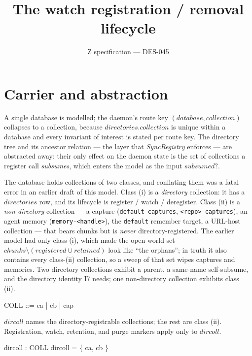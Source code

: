 \documentclass[a4paper]{article}
\begin{document}
\title{The watch registration / removal lifecycle}
\author{Z specification --- DES-045}
\date{}
\maketitle

\section{Carrier and abstraction}

A single database is modelled; the daemon's route key $(database, collection)$
collapses to a collection, because $directories.collection$ is unique within a
database and every invariant of interest is stated per route key.  The
directory tree and its ancestor relation --- the layer that
\textit{SyncRegistry} enforces --- are abstracted away: their only effect on the
daemon state is the set of collections a register call \textit{subsumes}, which
enters the model as the input $subsumed?$.

The database holds collections of two classes, and conflating them was a fatal
error in an earlier draft of this model.  Class (i) is a \textit{directory}
collection: it has a $directories$ row, and its lifecycle is register / watch /
deregister.  Class (ii) is a \textit{non-directory} collection --- a capture
(\texttt{default-captures}, \texttt{<repo>-captures}), an agent memory
(\texttt{memory-<handle>}), the \texttt{default} remember target, a URL-host
collection --- that bears chunks but is \textit{never} directory-registered.  The
earlier model had only class (i), which made the open-world set $chunks \setminus
(registered \cup retained)$ look like ``the orphans''; in truth it also contains
every class-(ii) collection, so a sweep of that set wipes captures and memories.
Two directory collections exhibit a parent, a same-name self-subsume, and the
directory identity I7 needs; one non-directory collection exhibits class (ii).

\begin{zed}
  COLL ::= ca | cb | cap
\end{zed}

$dircoll$ names the directory-registrable collections; the rest are class (ii).
Registration, watch, retention, and purge markers apply only to $dircoll$.

\begin{axdef}
  dircoll : \power COLL
\where
  dircoll = \{ ca, cb \}
\end{axdef}
\end{document}
